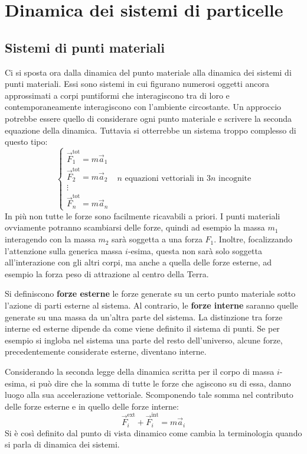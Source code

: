 \documentclass[10pt,a4paper]{book}
\begin{document}
\chapter{Dinamica dei sistemi di particelle}

\section{Sistemi di punti materiali}

Ci si sposta ora dalla dinamica del punto materiale alla dinamica dei sistemi di punti materiali. Essi sono sistemi in cui figurano numerosi oggetti ancora approssimati a corpi puntiformi che interagiscono tra di loro e contemporaneamente interagiscono con l'ambiente circostante.
Un approccio potrebbe essere quello di considerare ogni punto materiale e scrivere la seconda equazione della dinamica. Tuttavia si otterrebbe un sistema troppo complesso di questo tipo:
\[
	\begin{cases} \vec{F}_1^\text{tot}=m\vec{a}_1 \\ \vec{F}_2^\text{tot}=m\vec{a}_2 \\ \vdots \\ \vec{F}_n^\text{tot}=m\vec{a}_n  \end{cases} \text{ $n$ equazioni vettoriali in $3n$ incognite}
\]
In più non tutte le forze sono facilmente ricavabili a priori. I punti materiali ovviamente potranno scambiarsi delle forze, quindi ad esempio la massa $m_1$ interagendo con la massa $m_2$ sarà soggetta a una forza $F_1$. Inoltre, focalizzando l'attenzione sulla generica massa $i$-esima, questa non sarà solo soggetta all'interazione con gli altri corpi, ma anche a quella delle forze esterne, ad esempio la forza peso di attrazione al centro della Terra.

Si definiscono \textbf{forze esterne} le forze generate su un certo punto materiale sotto l'azione di parti esterne al sistema. Al contrario, le \textbf{forze interne} saranno quelle generate su una massa da un'altra parte del sistema.
La distinzione tra forze interne ed esterne dipende da come viene definito il sistema di punti. Se per esempio si ingloba nel sistema una parte del resto dell'universo, alcune forze, precedentemente considerate esterne, diventano interne.

Considerando la seconda legge della dinamica scritta per il corpo di massa $i$-esima, si può dire che la somma di tutte le forze che agiscono su di essa, danno luogo alla sua accelerazione vettoriale. Scomponendo tale somma nel contributo delle forze esterne e in quello delle forze interne:
\[
	\vec{F}_i^\text{ext}+\vec{F}_i^\text{int}=m\vec{a}_i
\]
Si è così definito dal punto di vista dinamico come cambia la terminologia quando si parla di dinamica dei sistemi.
\end{document}
